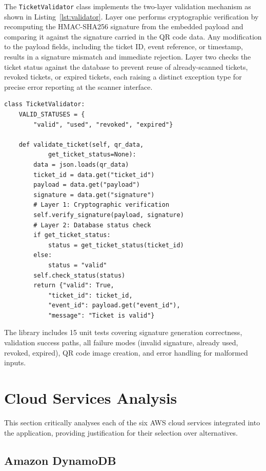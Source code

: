 \documentclass[conference]{IEEEtran}
\begin{document}
The \texttt{TicketValidator} class implements the two-layer validation mechanism as shown in Listing~\ref{lst:validator}. Layer one performs cryptographic verification by recomputing the HMAC-SHA256 signature from the embedded payload and comparing it against the signature carried in the QR code data. Any modification to the payload fields, including the ticket ID, event reference, or timestamp, results in a signature mismatch and immediate rejection. Layer two checks the ticket status against the database to prevent reuse of already-scanned tickets, revoked tickets, or expired tickets, each raising a distinct exception type for precise error reporting at the scanner interface.

\begin{lstlisting}[caption={Two-layer validation in TicketValidator.}, label={lst:validator}]
class TicketValidator:
    VALID_STATUSES = {
        "valid", "used", "revoked", "expired"}

    def validate_ticket(self, qr_data,
            get_ticket_status=None):
        data = json.loads(qr_data)
        ticket_id = data.get("ticket_id")
        payload = data.get("payload")
        signature = data.get("signature")
        # Layer 1: Cryptographic verification
        self.verify_signature(payload, signature)
        # Layer 2: Database status check
        if get_ticket_status:
            status = get_ticket_status(ticket_id)
        else:
            status = "valid"
        self.check_status(status)
        return {"valid": True,
            "ticket_id": ticket_id,
            "event_id": payload.get("event_id"),
            "message": "Ticket is valid"}
\end{lstlisting}

The library includes 15 unit tests covering signature generation correctness, validation success paths, all failure modes (invalid signature, already used, revoked, expired), QR code image creation, and error handling for malformed inputs.

\section{Cloud Services Analysis}

This section critically analyses each of the six AWS cloud services integrated into the application, providing justification for their selection over alternatives.

\subsection{Amazon DynamoDB}
\end{document}
